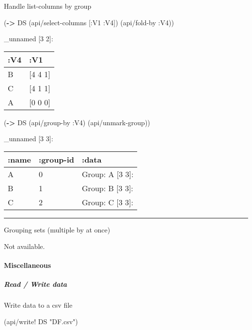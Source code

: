\documentclass[]{article}
\newenvironment{Shaded}{\begin{snugshade}}{\end{snugshade}}
\newcommand{\AttributeTok}[1]{\textcolor[rgb]{0.77,0.63,0.00}{#1}}
\newcommand{\KeywordTok}[1]{\textcolor[rgb]{0.13,0.29,0.53}{\textbf{#1}}}
\newcommand{\NormalTok}[1]{#1}
\newcommand{\StringTok}[1]{\textcolor[rgb]{0.31,0.60,0.02}{#1}}
\let\oldparagraph\paragraph
\renewcommand{\paragraph}[1]{\oldparagraph{#1}\mbox{}}
\let\oldsubparagraph\subparagraph
\renewcommand{\subparagraph}[1]{\oldsubparagraph{#1}\mbox{}}
\begin{document}
Handle list-columns by group

\begin{Shaded}
\begin{Highlighting}[]
\NormalTok{(}\KeywordTok{->}\NormalTok{ DS}
\NormalTok{    (api/select-columns [}\AttributeTok{:V1} \AttributeTok{:V4}\NormalTok{])}
\NormalTok{    (api/fold-by }\AttributeTok{:V4}\NormalTok{))}
\end{Highlighting}
\end{Shaded}

\_unnamed {[}3 2{]}:

\begin{longtable}[]{@{}ll@{}}
\toprule
:V4 & :V1\tabularnewline
\midrule
\endhead
B & {[}4 4 1{]}\tabularnewline
C & {[}4 1 1{]}\tabularnewline
A & {[}0 0 0{]}\tabularnewline
\bottomrule
\end{longtable}

\begin{Shaded}
\begin{Highlighting}[]
\NormalTok{(}\KeywordTok{->}\NormalTok{ DS    }
\NormalTok{    (api/group-by }\AttributeTok{:V4}\NormalTok{)}
\NormalTok{    (api/unmark-group))}
\end{Highlighting}
\end{Shaded}

\_unnamed {[}3 3{]}:

\begin{longtable}[]{@{}lll@{}}
\toprule
:name & :group-id & :data\tabularnewline
\midrule
\endhead
A & 0 & Group: A {[}3 3{]}:\tabularnewline
B & 1 & Group: B {[}3 3{]}:\tabularnewline
C & 2 & Group: C {[}3 3{]}:\tabularnewline
\bottomrule
\end{longtable}

\begin{center}\rule{0.5\linewidth}{0.5pt}\end{center}

Grouping sets (multiple by at once)

Not available.

\hypertarget{miscellaneous}{%
\paragraph{Miscellaneous}\label{miscellaneous}}

\hypertarget{read-write-data}{%
\subparagraph{Read / Write data}\label{read-write-data}}

Write data to a csv file

\begin{Shaded}
\begin{Highlighting}[]
\NormalTok{(api/write! DS }\StringTok{"DF.csv"}\NormalTok{)}
\end{Highlighting}
\end{Shaded}
\end{document}
